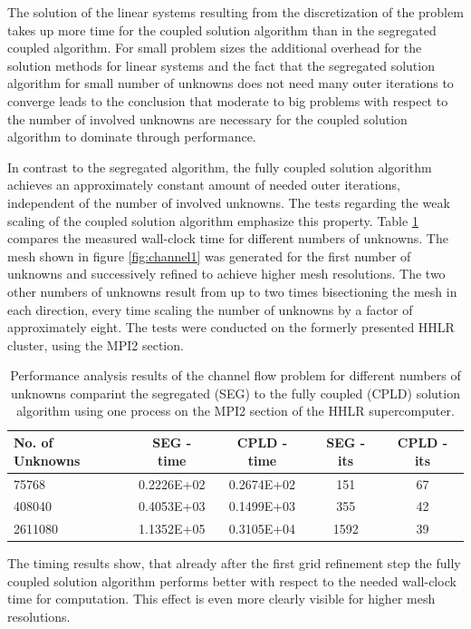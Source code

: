 The solution of the linear systems resulting from the discretization of the problem takes up more time for the coupled solution algorithm than in the segregated coupled algorithm. For small problem sizes the additional overhead for the solution methods for linear systems and the fact that the segregated solution algorithm for small number of unknowns does not need many outer iterations to converge leads to the conclusion that moderate to big problems with respect to the number of involved unknowns are necessary for the coupled solution algorithm to dominate through performance. 

In contrast to the segregated algorithm, the fully coupled solution algorithm achieves an approximately constant amount of needed outer iterations, independent of the number of involved unknowns. The tests regarding the weak scaling of the coupled solution algorithm emphasize this property. Table \ref{tab:channelcompare} compares the measured wall-clock time for different numbers of unknowns. The mesh shown in figure \ref{fig:channel1} was generated for the first number of unknowns and successively refined to achieve higher mesh resolutions. The two other numbers of unknowns result from up to two times bisectioning the mesh in each direction, every time scaling the number of unknowns by a factor of approximately eight. The tests were conducted on the formerly presented HHLR cluster, using the MPI2 section. 

\begin{table}[h!]\centering
  \caption{Performance analysis results of the channel flow problem for different numbers of unknowns comparint the segregated (SEG) to the fully coupled (CPLD) solution algorithm using one process on the MPI2 section of the HHLR supercomputer. }
  \begin{tabular}{lcccc}\toprule
    No. of Unknowns & SEG - time & CPLD - time & SEG - its & CPLD - its \\
    \midrule
    \rowcolor{black!20} 75768    & 0.2226E+02 & 0.2674E+02 & 151  & 67 \\
    \rowcolor{black!00} 408040   & 0.4053E+03 & 0.1499E+03 & 355  & 42 \\
    \rowcolor{black!20} 2611080  & 1.1352E+05 & 0.3105E+04 & 1592 & 39 \\
  \end{tabular}
  \label{tab:channelcompare}
\end{table}

The timing results show, that already after the first grid refinement step the fully coupled solution algorithm performs better with respect to the needed wall-clock time for computation. This effect is even more clearly visible for higher mesh resolutions.

